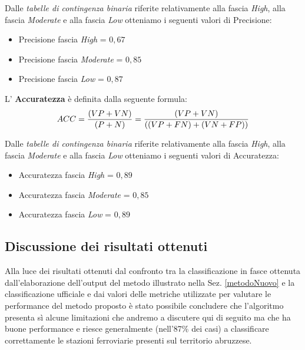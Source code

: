 Dalle \textit{tabelle di contingenza binaria} riferite relativamente alla fascia \textit{High}, alla fascia \textit{Moderate} e alla fascia \textit{Low} otteniamo i seguenti valori di Precisione:
\begin{itemize}
\item Precisione fascia \textit{High} = $0,67$
\item Precisione fascia \textit{Moderate} = $0,85$
\item Precisione fascia \textit{Low} = $0,87$
\end{itemize}

L' \textbf{Accuratezza} è definita dalla seguente formula:
\begin{equation}
ACC = {{(VP + VN)} \over {(P + N)} }= {{(VP + VN)} \over {((VP + FN) + (VN + FP))}}
\end{equation}

Dalle \textit{tabelle di contingenza binaria} riferite relativamente alla fascia \textit{High}, alla fascia \textit{Moderate} e alla fascia \textit{Low} otteniamo i seguenti valori di Accuratezza:
\begin{itemize}
\item Accuratezza fascia \textit{High} = $0,89$
\item Accuratezza fascia \textit{Moderate} = $0,85$
\item Accuratezza fascia \textit{Low} = $0,89$
\end{itemize}
\subsection{Discussione dei risultati ottenuti}
Alla luce dei risultati ottenuti dal confronto tra la classificazione in fasce ottenuta dall'elaborazione dell'output del metodo illustrato nella Sez. \ref{metodoNuovo} e la classificazione ufficiale e dai valori delle metriche utilizzate per valutare le performance del metodo proposto è stato possibile concludere che l'algoritmo presenta sì alcune limitazioni che andremo a discutere qui di seguito ma che ha buone performance e riesce generalmente (nell'87\% dei casi) a classificare correttamente le stazioni ferroviarie presenti sul territorio abruzzese.

